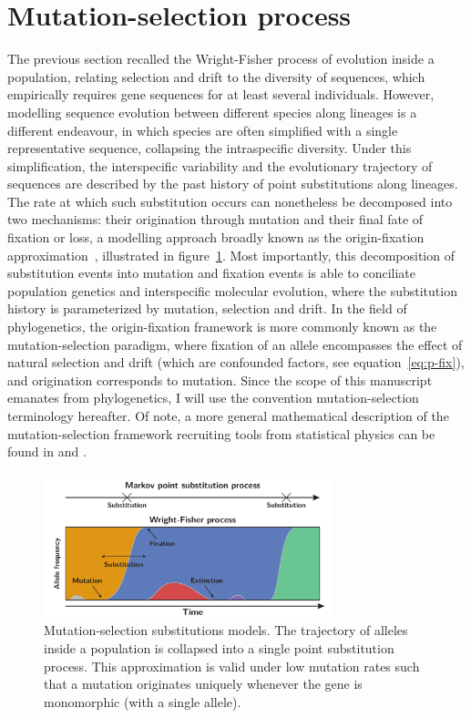\section{Mutation-selection process}
The previous section recalled the Wright-Fisher process of evolution inside a population, relating selection and drift to the diversity of sequences, which empirically requires gene sequences for at least several individuals.
However, modelling sequence evolution between different species along lineages is a different endeavour, in which species are often simplified with a single representative sequence, collapsing the intraspecific diversity.
Under this simplification, the interspecific variability and the evolutionary trajectory of sequences are described by the past history of point \glspl{substitution} along lineages.
The rate at which such \gls{substitution} occurs can nonetheless be decomposed into two mechanisms: their origination through mutation and their final fate of fixation or loss, a modelling approach broadly known as the origin-fixation approximation~\citep{McCandlish2014}, illustrated in figure~\ref{fig:point-process}.
Most importantly, this decomposition of \gls{substitution} events into mutation and fixation events is able to conciliate population genetics and interspecific molecular evolution, where the \gls{substitution} history is parameterized by mutation, selection and drift.
In the field of phylogenetics, the origin-fixation framework is more commonly known as the mutation-selection paradigm, where fixation of an \gls{allele} encompasses the effect of natural selection and drift (which are confounded factors, see equation~\ref{eq:p-fix}), and origination corresponds to mutation.
Since the scope of this manuscript emanates from phylogenetics, I will use the convention mutation-selection terminology hereafter.
Of note, a more general mathematical description of the mutation-selection framework recruiting tools from statistical physics can be found in \citet{Sella2005} and \citet{Mustonen2009}.

\begin{figure}[H]
    \centering
    \includegraphics[width=0.75\textwidth]{figures/point-process.pdf}
    \caption[Mutation-selection substitutions models]{
    Mutation-selection \glspl{substitution} models.
    The trajectory of \glspl{allele} inside a population is collapsed into a single point \gls{substitution} process.
    This approximation is valid under low mutation rates such that a mutation originates uniquely whenever the gene is monomorphic (with a single allele).}
    \label{fig:point-process}
\end{figure}

